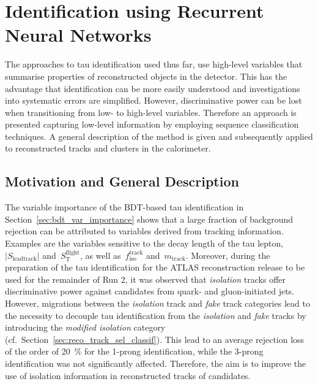 \section{Identification using Recurrent Neural Networks}
\label{sec:rnn_id}

The approaches to tau identification used thus far, use high-level variables
that summarise properties of reconstructed objects in the detector. This has the
advantage that identification can be more easily understood and investigations
into systematic errors are simplified. However, discriminative power can be lost
when transitioning from low- to high-level variables. Therefore an approach is
presented capturing low-level information by employing sequence classification
techniques. A general description of the method is given and subsequently
applied to reconstructed tracks and clusters in the calorimeter.

\subsection{Motivation and General Description}
\label{sec:rnn_descr}

The variable importance of the BDT-based tau identification in
Section~\ref{sec:bdt_var_importance} shows that a large fraction of background
rejection can be attributed to variables derived from tracking information.
Examples are the variables sensitive to the decay length of the tau lepton,
$|S_\text{leadtrack}|$ and~$S_\text{T}^\text{flight}$, as well
as~$f_\text{iso}^\text{track}$ and~$m_\text{track}$. Moreover, during the
preparation of the tau identification for the ATLAS reconstruction release to be
used for the remainder of Run 2, it was observed that \emph{isolation} tracks
offer discriminative power against \tauhadvis candidates from quark- and
gluon-initiated jets. However, migrations between the \emph{isolation} track and
\emph{fake} track categories lead to the necessity to decouple tau
identification from the \emph{isolation} and \emph{fake} tracks by introducing
the \emph{modified isolation} category (cf.\
Section~\ref{sec:reco_track_sel_classif}). This lead to an average rejection
loss of the order of \SI{20}{\percent} for the 1-prong identification, while the
3-prong identification was not significantly affected. Therefore, the aim is to
improve the use of isolation information in reconstructed tracks of \tauhadvis
candidates.

